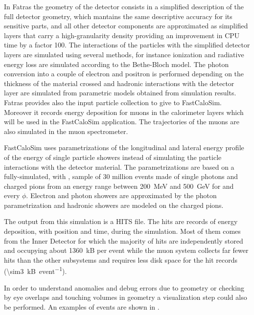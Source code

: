 In Fatras the geometry of the detector consists in a simplified description of the full detector geometry, which mantains the same descriptive accuracy for its sensitive parts, and all other detector components are approximated as simplified layers that carry a high-granularity density providing an improvement in CPU time by a factor \num{100}. The interactions of the particles with the simplified detector layers are simulated using several methods, for instance ionization and radiative energy loss are simulated according to the Bethe-Bloch model. The photon conversion into a couple of electron and positron is performed depending on the thickness of the material crossed and hadronic interactions with the detector layer are simulated from parametric models obtained from \geant simulation results. Fatras provides also the input particle collection to give to FastCaloSim. Moreover it records energy deposition for muons in the calorimeter layers which will be used in the FastCaloSim application. The trajectories of the muons are also simulated in the muon spectrometer.

FastCaloSim uses parametrizations of the longitudinal and lateral energy profile of the energy of single particle showers instead of simulating the particle interactions with the detector material. The parametrizations are based on a fully-simulated, with \geant, sample of 30 million events made of single photons and charged pions from an energy range between \SI{200}{\MeV} and \SI{500}{\GeV} for  and every $\phi$. Electron and photon showers are approximated by the photon parametrization and hadronic showers are modeled on the charged pions.

The output from this simulation is a HITS file. The hits are records of energy deposition, with position and time, during the simulation. Most of them comes from the Inner Detector for which the majority of hits are independently stored and occupying about \SI{1360}{kB} per event while the muon system collects far fewer hits than the other subsystems and requires less disk space for the hit records (\SI{\sim3}{kB\per event}).

In order to understand anomalies and debug errors due to geometry or checking by eye overlaps and touching volumes in geometry a visualization step could also be performed. An examples of events are shown in \Fig{\ref{fig:simulation}}.

